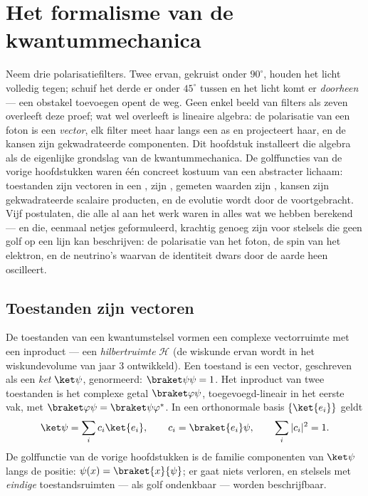 \chapter{Het formalisme van de kwantummechanica}\label{ch:b3:quantum-formalism}

Neem drie polarisatiefilters. Twee ervan, gekruist onder $90^\circ$,
houden het licht volledig tegen; schuif het derde er onder $45^\circ$
tussen en het licht komt er \emph{doorheen} --- een obstakel toevoegen
opent de weg. Geen enkel beeld van filters als zeven overleeft deze proef;
wat wel overleeft is lineaire algebra: de polarisatie van een foton is een
\emph{vector}, elk filter meet haar langs een as en projecteert haar, en de
kansen zijn gekwadrateerde componenten. Dit hoofdstuk installeert die
algebra als de eigenlijke grondslag van de kwantummechanica. De
golffuncties van de vorige hoofdstukken waren één concreet kostuum van een
abstracter lichaam: toestanden zijn vectoren in een ,
 zijn , gemeten waarden zijn
, kansen zijn gekwadrateerde scalaire producten, en de
evolutie wordt door de  voortgebracht. Vijf postulaten, die
alle al aan het werk waren in alles wat we hebben berekend --- en die,
eenmaal netjes geformuleerd, krachtig genoeg zijn voor stelsels die geen
golf op een lijn kan beschrijven: de polarisatie van het foton, de spin van
het elektron, en de neutrino's waarvan de identiteit dwars door de aarde
heen oscilleert.

\section{Toestanden zijn vectoren}

\begin{definition}\label{def:b3:quantum-formalism:state}
De toestanden van een kwantumstelsel vormen een complexe vectorruimte met
een inproduct --- een \emph{hilbertruimte} $\mathcal H$ (de wiskunde
ervan wordt in het wiskundevolume van jaar 3 ontwikkeld). Een toestand is
een vector, geschreven als een \emph{ket} $\ket\psi$, genormeerd:
$\braket\psi\psi = 1$. Het inproduct van twee toestanden is het complexe
getal $\braket\varphi\psi$, toegevoegd-lineair in het eerste vak, met
$\braket\varphi\psi = \braket\psi\varphi^*$. In een orthonormale basis
$\{\ket{e_i}\}$ geldt
\[
\ket\psi = \sum_i c_i\ket{e_i} , \qquad
c_i = \braket{e_i}\psi , \qquad
\sum_i|c_i|^2 = 1 .
\]
De golffunctie van de vorige hoofdstukken is de familie componenten van
$\ket\psi$ langs de positie: $\psi(x) =
\braket{x}{\psi}$; er gaat niets
verloren, en stelsels met \emph{eindige} toestandsruimten --- als golf
ondenkbaar --- worden beschrijfbaar.
\end{definition}

